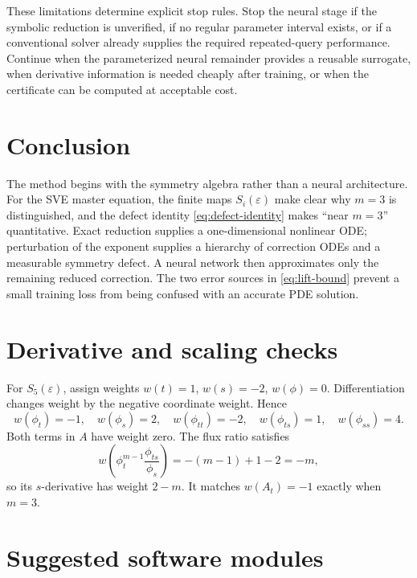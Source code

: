 \documentclass[11pt]{article}
\newcommand{\eps}{\varepsilon}
\begin{document}
These limitations determine explicit stop rules.  Stop the neural stage if the symbolic reduction is unverified, if no regular parameter interval exists, or if a conventional solver already supplies the required repeated-query performance.  Continue when the parameterized neural remainder provides a reusable surrogate, when derivative information is needed cheaply after training, or when the certificate can be computed at acceptable cost.

\section{Conclusion}

The method begins with the symmetry algebra rather than a neural architecture.  For the SVE master equation, the finite maps $S_i(\eps)$ make clear why $m=3$ is distinguished, and the defect identity \cref{eq:defect-identity} makes ``near $m=3$'' quantitative.  Exact reduction supplies a one-dimensional nonlinear ODE; perturbation of the exponent supplies a hierarchy of correction ODEs and a measurable symmetry defect.  A neural network then approximates only the remaining reduced correction.  The two error sources in \cref{eq:lift-bound} prevent a small training loss from being confused with an accurate PDE solution.

\appendix
\section{Derivative and scaling checks}

For $S_5(\eps)$, assign weights $w(t)=1$, $w(s)=-2$, $w(\phi)=0$.  Differentiation changes weight by the negative coordinate weight.  Hence
\[
 w(\phi_t)=-1,\quad w(\phi_s)=2,\quad
 w(\phi_{tt})=-2,\quad w(\phi_{ts})=1,\quad w(\phi_{ss})=4.
\]
Both terms in $A$ have weight zero.  The flux ratio satisfies
\[
 w\!\left(\phi_t^{m-1}\frac{\phi_{ts}}{\phi_s}\right)
 =-(m-1)+1-2=-m,
\]
so its $s$-derivative has weight $2-m$.  It matches $w(A_t)=-1$ exactly when $m=3$.

\section{Suggested software modules}
\end{document}
